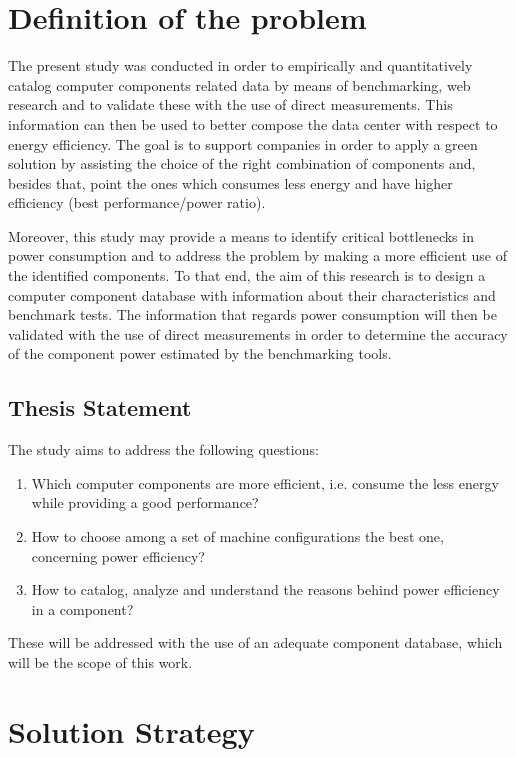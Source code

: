 \section{Definition of the problem} \label{sec1:problem}

    The present study was conducted in order to empirically and quantitatively catalog computer components related data by means of benchmarking, web research and to validate these with the use of direct measurements. This information can then be used to better compose the data center with respect to energy efficiency. The goal is to support companies in order to apply a green solution by assisting the choice of the right combination of components and, besides that, point the ones which consumes less energy and have higher efficiency (best performance/power ratio).
    
    Moreover, this study may provide a means to identify critical bottlenecks in power consumption and to address the problem by making a more efficient use of the identified components. To that end, the aim of this research is to design a computer component database with information about their characteristics and benchmark tests. The information that regards power consumption will then be validated with the use of direct measurements in order to determine the accuracy of the component power estimated by the benchmarking tools.
    
    \subsection{Thesis Statement}\label{sec1:thesis_statement}
        The study aims to address the following questions:
        \begin{enumerate}
	        \item Which computer components are more efficient, i.e. consume the less energy while providing a good performance?
	        \item How to choose among a set of machine configurations the best one, concerning power efficiency?
	        \item How to catalog, analyze and understand the reasons behind power efficiency in a component?
        \end{enumerate}
        
    These will be addressed with the use of an adequate component database, which will be the scope of this work.

\section{Solution Strategy} \label{sec1:solution_strategy}

